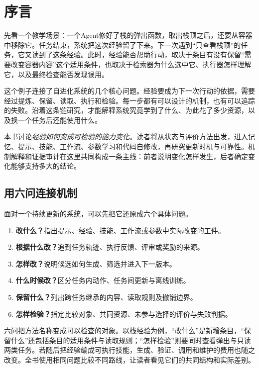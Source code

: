 \chapter{序言}

先看一个教学场景：一个Agent修好了栈的弹出函数，取出栈顶之后，还要从容器中移除它。任务结束，系统把这次经验留了下来。下一次遇到“只查看栈顶”的任务，它又读到了这条经验。此时，经验能否帮助行动，取决于条目有没有保留“需要改变容器内容”这个适用条件，也取决于检索器为什么选中它、执行器怎样理解它，以及最终检查能否发现误用。

这个例子连接了自进化系统的几个核心问题。经验要成为下一次行动的依据，需要经过提炼、保留、读取、执行和检验。每一步都有可以设计的机制，也有可以追踪的失败。沿着这条链研究，才能解释系统究竟学到了什么、为此花了多少资源，以及换一个任务后还能使用什么。

本书讨论\emph{经验如何变成可检验的能力变化}。读者将从状态与评价方法出发，进入记忆、提示、技能、工作流、参数学习和代码自修改，再研究更新时机与可靠性。机制解释和证据审计在这里共同构成一条主线：前者说明变化怎样发生，后者确定变化能够支持多大的结论。

\section*{用六问连接机制}

面对一个持续更新的系统，可以先把它还原成六个具体问题。
\begin{enumerate}[label=Q\arabic*.]
  \item \textbf{改什么？}指出提示、经验、技能、工作流或参数中实际改变的工件。
  \item \textbf{根据什么改？}追到任务轨迹、执行反馈、评审或奖励的来源。
  \item \textbf{怎样改？}说明候选如何生成、筛选并进入下一版本。
  \item \textbf{什么时候改？}区分任务内动作、任务间更新与离线训练。
  \item \textbf{保留什么？}列出跨任务继承的内容、读取规则及撤销边界。
  \item \textbf{怎样检验？}指定比较对象、共同资源、未参与选择的评价与失败判据。
\end{enumerate}

六问把方法名称变成可以检查的对象。以栈经验为例，“改什么”是新增条目，“保留什么”还包括条目的适用条件与读取规则；“怎样检验”则要同时查看弹出与只读两类任务。若随后把经验编成可执行技能，生成、验证、调用和维护的费用也随之改变。全书使用相同问题比较不同路线，让读者看见它们的共同结构和实际差别。

